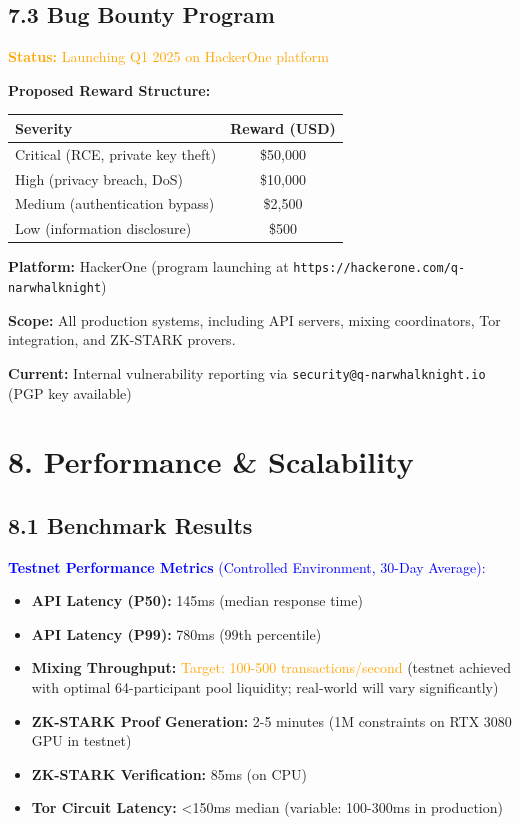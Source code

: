 \documentclass[11pt,a4paper]{article}
\begin{document}
\subsection{7.3 Bug Bounty Program}

\textcolor{orange}{\textbf{Status:} Launching Q1 2025 on HackerOne platform}

\textbf{Proposed Reward Structure:}

\begin{table}[h]
\centering
\begin{tabular}{lc}
\toprule
\textbf{Severity} & \textbf{Reward (USD)} \\
\midrule
Critical (RCE, private key theft) & \$50,000 \\
High (privacy breach, DoS) & \$10,000 \\
Medium (authentication bypass) & \$2,500 \\
Low (information disclosure) & \$500 \\
\bottomrule
\end{tabular}
\end{table}

\textbf{Platform:} HackerOne (program launching at \texttt{https://hackerone.com/q-narwhalknight})

\textbf{Scope:} All production systems, including API servers, mixing coordinators, Tor integration, and ZK-STARK provers.

\vspace{0.3cm}
\noindent
\textbf{Current:} Internal vulnerability reporting via \texttt{security@q-narwhalknight.io} (PGP key available)

\section{8. Performance \& Scalability}

\subsection{8.1 Benchmark Results}

\textcolor{blue}{\textbf{Testnet Performance Metrics} (Controlled Environment, 30-Day Average):}

\begin{itemize}
    \item \textbf{API Latency (P50):} 145ms (median response time)
    \item \textbf{API Latency (P99):} 780ms (99th percentile)
    \item \textbf{Mixing Throughput:} \textcolor{orange}{Target: 100-500 transactions/second} (testnet achieved with optimal 64-participant pool liquidity; real-world will vary significantly)
    \item \textbf{ZK-STARK Proof Generation:} 2-5 minutes (1M constraints on RTX 3080 GPU in testnet)
    \item \textbf{ZK-STARK Verification:} 85ms (on CPU)
    \item \textbf{Tor Circuit Latency:} <150ms median (variable: 100-300ms in production)
\end{itemize}
\end{document}
